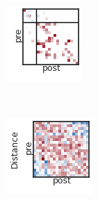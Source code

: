 \begin{figure}[t!]
\begin{subfigure}[b]{1.10in}
  \end{subfigure}
  ~
  \hspace{-.1in}
  \begin{subfigure}[b]{1.10in}
    \centering
    \includegraphics[width=\textwidth]{figures/ch3/Distance-SBM.png}
  \end{subfigure}
  \\
  \vspace{-.1in}
  \hspace{1em}
  \begin{subfigure}[b]{1.25in}
    \centering
    \includegraphics[width=\textwidth]{figures/ch3/Dense-Distance.png}

\end{subfigure}
\end{figure}
